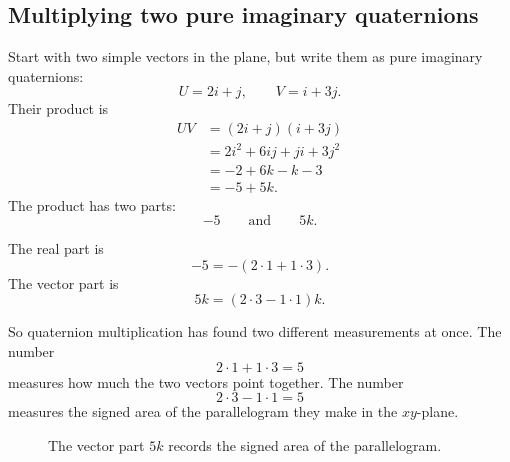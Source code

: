 \subsection{Multiplying two pure imaginary quaternions}

Start with two simple vectors in the plane, but write them as pure imaginary
quaternions:
\[
    U=2i+j,
    \qquad
    V=i+3j.
\]
Their product is
\[
\begin{aligned}
    UV
    &=(2i+j)(i+3j)\\
    &=2i^2+6ij+ji+3j^2\\
    &=-2+6k-k-3\\
    &=-5+5k.
\end{aligned}
\]
The product has two parts:
\[
    -5
    \qquad\text{and}\qquad
    5k.
\]

The real part is
\[
    -5=-(2\cdot 1+1\cdot 3).
\]
The vector part is
\[
    5k=(2\cdot3-1\cdot1)k.
\]

So quaternion multiplication has found two different measurements at once.  The number
\[
    2\cdot1+1\cdot3=5
\]
measures how much the two vectors point together.  The number
\[
    2\cdot3-1\cdot1=5
\]
measures the signed area of the parallelogram they make in the \(xy\)-plane.

\begin{figure}[h]
\centering
{}
\caption{The vector part \(5k\) records the signed area of the parallelogram.}
\end{figure}

